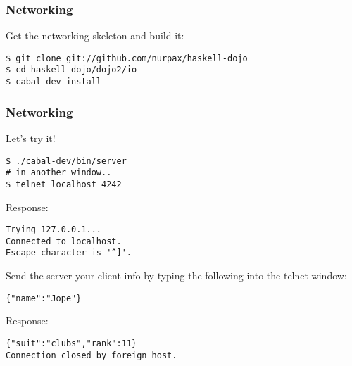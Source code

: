 \documentclass{beamer}
\begin{document}
\begin{frame}[fragile]
\frametitle{Networking}

Get the networking skeleton and build it:

\begin{verbatim}
$ git clone git://github.com/nurpax/haskell-dojo
$ cd haskell-dojo/dojo2/io
$ cabal-dev install
\end{verbatim}

\end{frame}


\begin{frame}[fragile]
\frametitle{Networking}

Let's try it!

{\small
\begin{verbatim}
$ ./cabal-dev/bin/server
# in another window..
$ telnet localhost 4242
\end{verbatim}
}

Response:

{\small
\begin{verbatim}
Trying 127.0.0.1...
Connected to localhost.
Escape character is '^]'.
\end{verbatim}
}

Send the server your client info by typing the following into the telnet window:

{\small
\begin{verbatim}
{"name":"Jope"}
\end{verbatim}
}

Response:

{\small
\begin{verbatim}
{"suit":"clubs","rank":11}
Connection closed by foreign host.
\end{verbatim}
}

\end{frame}
\end{document}
